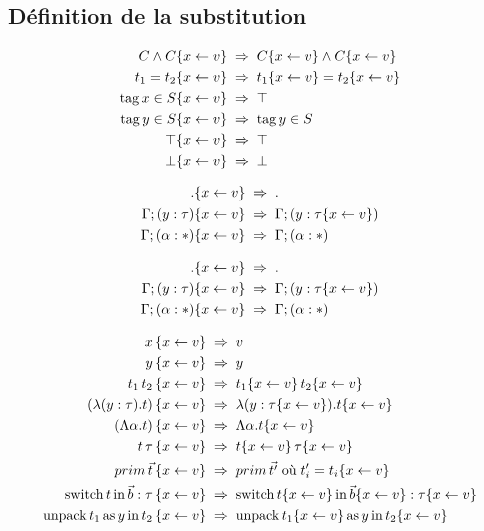 \subsection{Définition de la substitution}

\newcommand\subst{\{\var \leftarrow v\}}
\begin{align*}
           C \wedge C \subst \;&\Rightarrow\; C\subst \wedge C\subst        \\
    \term_1 = \term_2 \subst \;&\Rightarrow\; \term_1\subst = \term_2\subst \\
  \kw{tag} \var \in S \subst \;&\Rightarrow\; \top \\
  \kw{tag} y    \in S \subst \;&\Rightarrow\; \kw{tag} y \in S \\
                 \top \subst \;&\Rightarrow\; \top \\
                 \bot \subst \;&\Rightarrow\; \bot \\
\end{align*}

\begin{align*}
                            . \subst \;&\Rightarrow\; . \\
     \tyenvcons\tyenv{y}{\ty} \subst \;&\Rightarrow\; \tyenvcons\tyenv{y}{\ty \subst} \\
  \tyenvcons\tyenv{\alpha}{*} \subst \;&\Rightarrow\; \tyenvcons\tyenv{\alpha}{*} 
\end{align*}

\begin{align*}
                            . \subst \;&\Rightarrow\; . \\
     \tyenvcons\tyenv{y}{\ty} \subst \;&\Rightarrow\; \tyenvcons\tyenv{y}{\ty \subst} \\
  \tyenvcons\tyenv{\alpha}{*} \subst \;&\Rightarrow\; \tyenvcons\tyenv{\alpha}{*} 
\end{align*}

\begin{align*}
  \var
   \, \subst \;&\Rightarrow\; v
    \\
  y
   \, \subst \;&\Rightarrow\; y
    \\
  \term_1 \, \term_2
   \, \subst \;&\Rightarrow\; \term_1 \subst \, \term_2 \subst
    \\
  (\lambda \binding{y}{\ty} . \term)
   \, \subst \;&\Rightarrow\; \lambda \binding{y}{\ty \subst} . \term \subst
    \\
  (\Lambda \tyvar . \term)
   \, \subst \;&\Rightarrow\; \Lambda \tyvar . \term \subst
    \\
  \term \, \ty
   \, \subst \;&\Rightarrow\; \term \subst \, \ty \subst
    \\
  prim \, \vec{\term}
   \, \subst \;&\Rightarrow\; prim \, \vec{\term'} \; \text{où} \; \term'_i = \term_i \subst
    \\
  \kw{switch} \term \kw{in} \vec{b} : \ty
   \, \subst \;&\Rightarrow\; 
  \kw{switch} \term \subst \kw{in} \vec{b} \subst : \ty \subst 
    \\
  \kw{unpack} \term_1 \kw{as} y \kw{in} \term_2
   \, \subst \;&\Rightarrow\; 
  \kw{unpack} \term_1 \subst \kw{as} y \kw{in} \term_2 \subst
    \\
\end{align*}

